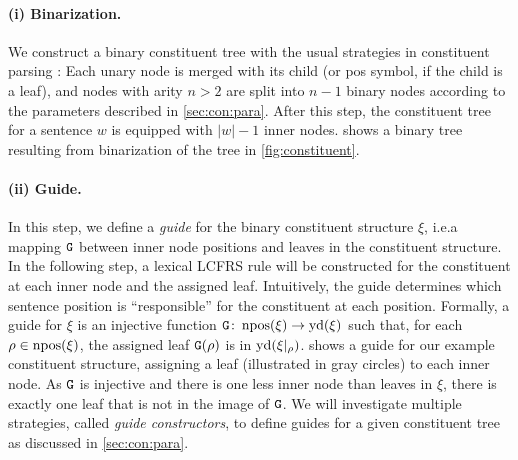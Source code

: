 \documentclass[../../document.tex]{subfiles}
\begin{document}

    \paragraph{(i) Binarization.}
    We construct a binary constituent tree with the usual strategies in constituent parsing \cite{KalMai13}:
    Each unary node is merged with its child (or pos symbol, if the child is a leaf), and nodes with arity \(n>2\) are split into \(n-1\) binary nodes according to the parameters described in \cref{sec:con:para}.
    After this step, the constituent tree for a sentence \(w\) is equipped with \(|w|-1\) inner nodes.
     shows a binary tree resulting from binarization of the tree in \cref{fig:constituent}.

    \paragraph{(ii) Guide.}
    In this step, we define a \emph{guide} for the binary constituent structure \(\xi\), i.e.\@ a mapping \(\texttt{G}\) between inner node positions and leaves in the constituent structure.
    In the following step, a lexical LCFRS rule will be constructed for the constituent at each inner node and the assigned leaf.
    Intuitively, the guide determines which sentence position is ``responsible'' for the constituent at each position.
    Formally, a guide for \(\xi\) is an injective function \(\texttt{G}\colon \operatorname{npos}(\xi) \to \operatorname{yd}(\xi)\) such that, for each \(\rho \in \operatorname{npos}(\xi)\), the assigned leaf \(\texttt{G}(\rho)\) is in \(\operatorname{yd}(\xi|_\rho)\).
     shows a guide for our example constituent structure, assigning a leaf (illustrated in gray circles) to each inner node.
    As \(\texttt{G}\) is injective and there is one less inner node than leaves in \(\xi\), there is exactly one leaf that is not in the image of \(\texttt{G}\).
    We will investigate multiple strategies, called \emph{guide constructors}, to define guides for a given constituent tree as discussed in \cref{sec:con:para}.
\end{document}
